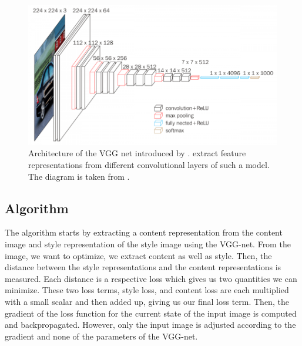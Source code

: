 \documentclass{seminar}
\begin{document}
	\begin{figure} %
		\centering
		\includegraphics[scale=0.37]{vgg16.png}
		\caption{Architecture of the VGG net introduced by \cite{simonyan2014very}. \cite{gatys2015neural} extract feature representations from different convolutional layers of such a model. The diagram is taken from \cite{loukadakis2018accelerating}.}
		\label{fig:vgg}
	\end{figure}
	
	\subsection{Algorithm}
	The algorithm starts by extracting a content representation from the content image and style representation of the style image using the VGG-net. From the image, we want to optimize, we extract content as well as style. Then, the distance between the style representations and the content representations is measured. Each distance is a respective loss which gives us two quantities we can minimize. These two loss terms, style loss, and content loss are each multiplied with a small scalar and then added up, giving us our final loss term. Then, the gradient of the loss function for the current state of the input image is computed and backpropagated. However, only the input image is adjusted according to the gradient and none of the parameters of the VGG-net.
	
	
\end{document}
